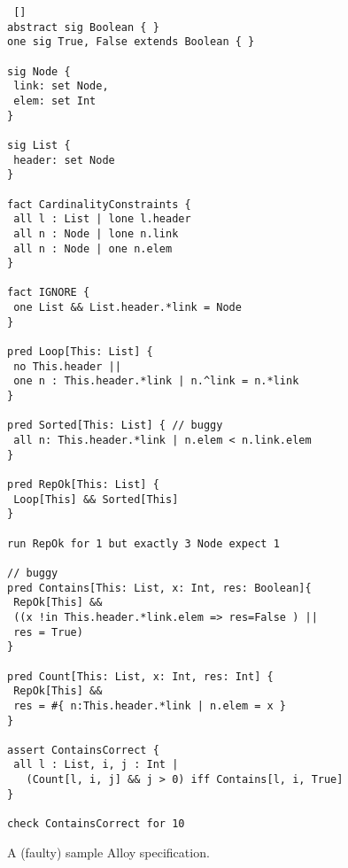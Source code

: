 \begin{figure}[ht!]
\begin{lstlisting} []
abstract sig Boolean { }
one sig True, False extends Boolean { }

sig Node {
 link: set Node,
 elem: set Int
}

sig List {
 header: set Node
}

fact CardinalityConstraints {
 all l : List | lone l.header
 all n : Node | lone n.link
 all n : Node | one n.elem
}

fact IGNORE {
 one List && List.header.*link = Node
}

pred Loop[This: List] {
 no This.header || 
 one n : This.header.*link | n.^link = n.*link 
}

pred Sorted[This: List] { // buggy
 all n: This.header.*link | n.elem < n.link.elem 
}

pred RepOk[This: List] {
 Loop[This] && Sorted[This]
}

run RepOk for 1 but exactly 3 Node expect 1

// buggy
pred Contains[This: List, x: Int, res: Boolean]{ 
 RepOk[This] &&
 ((x !in This.header.*link.elem => res=False ) || 
 res = True) 
}

pred Count[This: List, x: Int, res: Int] {
 RepOk[This] &&
 res = #{ n:This.header.*link | n.elem = x }
}

assert ContainsCorrect {
 all l : List, i, j : Int | 
   (Count[l, i, j] && j > 0) iff Contains[l, i, True]
}

check ContainsCorrect for 10
\end{lstlisting}
\caption{A (faulty) sample Alloy specification.}
\label{alloy-model}
\end{figure}

